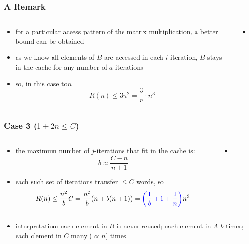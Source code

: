 \documentclass[12pt,dvipdfmx]{beamer}
\newcommand{\ao}[1]{{\color{blue}#1}}
\begin{document}
\begin{frame}[fragile]
\frametitle{A Remark}
\begin{columns}
  \begin{column}{0.5\textwidth}
    \begin{itemize}
    \item for a particular access pattern of the
      matrix multiplication,
      a better bound can be obtained
    \item as we know all elements of $B$ are accessed in each $i$-iteration,
      $B$ stays in the cache for any number of $a$ iterations
    \item so, in this case too,
      \[ R(n) \leq 3n^2 = \frac{3}{n} \cdot n^3 \]
\end{itemize}
\end{column}

\begin{column}{0.5\textwidth}
  \begin{itemize}
  \item []
{\tiny\def\svgwidth{0.9\textwidth}
}
\end{itemize}
\end{column}
\end{columns}

\end{frame}


\begin{frame}
\frametitle{Case 3 ($1 + 2n \leq C$)}
\begin{columns}
  \begin{column}{0.5\textwidth}
\begin{itemize}
\item the maximum number of $j$-iterations
  that fit in the cache is:
\[ b \approx \frac{C - n}{n + 1} \]
\item each such set of iterations transfer $\leq C$ words, so
\[ R(n) \leq \frac{n^2}{b} C 
= \frac{n^2}{b} (n + b(n + 1))
= \ao{\left(\frac{1}{b} + 1 + \frac{1}{n} \right)} n^3
\]
\end{itemize}
  \end{column}

  \begin{column}{0.5\textwidth}
    \begin{itemize}
    \item []
{\tiny\def\svgwidth{0.9\textwidth}}
\end{itemize}
\end{column}
\end{columns}

\begin{itemize}
\item []
\ao{interpretation:} each element in $B$ is never reused; 
each element in $A$ $b$ times; 
each clement in $C$ many ($\propto n$) times 
\end{itemize}
\end{frame}
\end{document}
